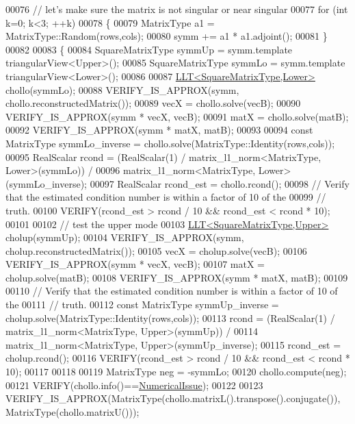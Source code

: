 \begin{DoxyCode}
00076   \textcolor{comment}{// let's make sure the matrix is not singular or near singular}
00077   \textcolor{keywordflow}{for} (\textcolor{keywordtype}{int} k=0; k<3; ++k)
00078   \{
00079     MatrixType a1 = MatrixType::Random(rows,cols);
00080     symm += a1 * a1.adjoint();
00081   \}
00082 
00083   \{
00084     SquareMatrixType symmUp = symm.template triangularView<Upper>();
00085     SquareMatrixType symmLo = symm.template triangularView<Lower>();
00086 
00087     \hyperlink{group___cholesky___module_class_eigen_1_1_l_l_t}{LLT<SquareMatrixType,Lower>} chollo(symmLo);
00088     VERIFY\_IS\_APPROX(symm, chollo.reconstructedMatrix());
00089     vecX = chollo.solve(vecB);
00090     VERIFY\_IS\_APPROX(symm * vecX, vecB);
00091     matX = chollo.solve(matB);
00092     VERIFY\_IS\_APPROX(symm * matX, matB);
00093 
00094     \textcolor{keyword}{const} MatrixType symmLo\_inverse = chollo.solve(MatrixType::Identity(rows,cols));
00095     RealScalar rcond = (RealScalar(1) / matrix\_l1\_norm<MatrixType, Lower>(symmLo)) /
00096                              matrix\_l1\_norm<MatrixType, Lower>(symmLo\_inverse);
00097     RealScalar rcond\_est = chollo.rcond();
00098     \textcolor{comment}{// Verify that the estimated condition number is within a factor of 10 of the}
00099     \textcolor{comment}{// truth.}
00100     VERIFY(rcond\_est > rcond / 10 && rcond\_est < rcond * 10);
00101 
00102     \textcolor{comment}{// test the upper mode}
00103     \hyperlink{group___cholesky___module_class_eigen_1_1_l_l_t}{LLT<SquareMatrixType,Upper>} cholup(symmUp);
00104     VERIFY\_IS\_APPROX(symm, cholup.reconstructedMatrix());
00105     vecX = cholup.solve(vecB);
00106     VERIFY\_IS\_APPROX(symm * vecX, vecB);
00107     matX = cholup.solve(matB);
00108     VERIFY\_IS\_APPROX(symm * matX, matB);
00109 
00110     \textcolor{comment}{// Verify that the estimated condition number is within a factor of 10 of the}
00111     \textcolor{comment}{// truth.}
00112     \textcolor{keyword}{const} MatrixType symmUp\_inverse = cholup.solve(MatrixType::Identity(rows,cols));
00113     rcond = (RealScalar(1) / matrix\_l1\_norm<MatrixType, Upper>(symmUp)) /
00114                              matrix\_l1\_norm<MatrixType, Upper>(symmUp\_inverse);
00115     rcond\_est = cholup.rcond();
00116     VERIFY(rcond\_est > rcond / 10 && rcond\_est < rcond * 10);
00117 
00118 
00119     MatrixType neg = -symmLo;
00120     chollo.compute(neg);
00121     VERIFY(chollo.info()==\hyperlink{group__enums_gga85fad7b87587764e5cf6b513a9e0ee5eaaf9b736d310a664e7729d163a035cc5f}{NumericalIssue});
00122 
00123     VERIFY\_IS\_APPROX(MatrixType(chollo.matrixL().transpose().conjugate()), MatrixType(chollo.matrixU()));

\end{DoxyCode}
